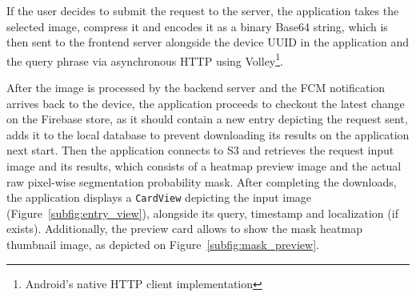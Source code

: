 If the user decides to submit the request to the server, the application takes the selected image, compress it and encodes it as a binary Base64 string, which is then sent to the frontend server alongside the device UUID in the application and the query phrase via asynchronous HTTP using Volley\footnote{Android's native HTTP client implementation}.

After the image is processed by the backend server and the FCM notification arrives back to the device, the application proceeds to checkout the latest change on the Firebase store, as it should contain a new entry depicting the request sent, adds it to the local database to prevent downloading its results on the application next start. Then the application connects to S3 and retrieves the request input image and its results, which consists of a heatmap preview image and the actual raw pixel-wise segmentation probability mask. After completing the downloads, the application displays a \texttt{CardView} depicting the input image (Figure~\ref{subfig:entry_view}), alongside its query, timestamp and localization (if exists). Additionally, the preview card allows to show the mask heatmap thumbnail image, as depicted on Figure~\ref{subfig:mask_preview}.

